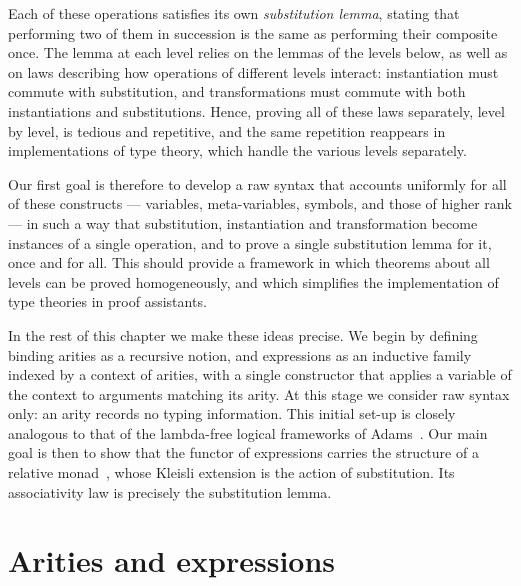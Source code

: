 Each of these operations satisfies its own \emph{substitution lemma}, stating that performing two of them in succession is the same as performing their composite once. The lemma at each level relies on the lemmas of the levels below, as well as on laws describing how operations of different levels interact: instantiation must commute with substitution, and transformations must commute with both instantiations and substitutions. Hence, proving all of these laws separately, level by level, is tedious and repetitive, and the same repetition reappears in implementations of type theory, which handle the various levels separately.

Our first goal is therefore to develop a raw syntax that accounts uniformly for all of these constructs --- variables, meta-variables, symbols, and those of higher rank --- in such a way that substitution, instantiation and transformation become instances of a single operation, and to prove a single substitution lemma for it, once and for all. This should provide a framework in which theorems about all levels can be proved homogeneously, and which simplifies the implementation of type theories in proof assistants.

In the rest of this chapter we make these ideas precise. We begin by defining binding arities as a recursive notion, and expressions as an inductive family indexed by a context of arities, with a single constructor that applies a variable of the context to arguments matching its arity. At this stage we consider raw syntax only: an arity records no typing information. This initial set-up is closely analogous to that of the lambda-free logical frameworks of Adams~\cite{Adams2008}. Our main goal is then to show that the functor of expressions carries the structure of a relative monad~\cite{AltenkirchChapmanUustalu2015}, whose Kleisli extension is the action of substitution. Its associativity law is precisely the substitution lemma.

\section{Arities and expressions}

